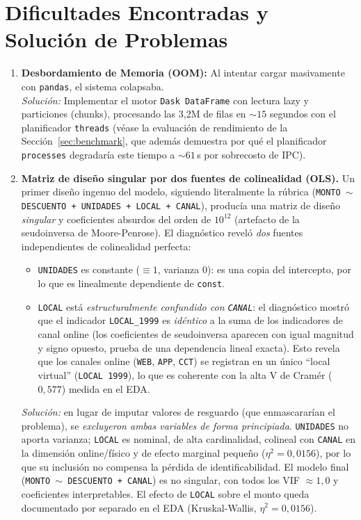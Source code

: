 \documentclass[12pt,letterpaper]{article}
\begin{document}
\section{Dificultades Encontradas y Solución de Problemas}
\label{sec:dificultades}
\begin{enumerate}
    \item \textbf{Desbordamiento de Memoria (OOM):} Al intentar cargar masivamente con \texttt{pandas}, el sistema colapsaba. \\ 
    \textit{Solución:} Implementar el motor \texttt{Dask DataFrame} con lectura lazy y particiones (chunks), procesando las 3,2M de filas en $\sim 15$ segundos con el planificador \texttt{threads} (véase la evaluación de rendimiento de la Sección~\ref{sec:benchmark}, que además demuestra por qué el planificador \texttt{processes} degradaría este tiempo a $\sim 61$\,s por sobrecosto de IPC).
    \item \textbf{Matriz de diseño singular por dos fuentes de colinealidad (OLS).} Un primer diseño ingenuo del modelo, siguiendo literalmente la rúbrica (\texttt{MONTO $\sim$ DESCUENTO + UNIDADES + LOCAL + CANAL}), producía una matriz de diseño \textit{singular} y coeficientes absurdos del orden de $10^{12}$ (artefacto de la seudoinversa de Moore-Penrose). El diagnóstico reveló \textit{dos} fuentes independientes de colinealidad perfecta:
    \begin{itemize}
        \item \texttt{UNIDADES} es constante ($\equiv 1$, varianza 0): es una copia del intercepto, por lo que es linealmente dependiente de \texttt{const}.
        \item \texttt{LOCAL} está \textit{estructuralmente confundido con \texttt{CANAL}}: el diagnóstico mostró que el indicador \texttt{LOCAL\_1999} es \textit{idéntico} a la suma de los indicadores de canal online (los coeficientes de seudoinversa aparecen con igual magnitud y signo opuesto, prueba de una dependencia lineal exacta). Esto revela que los canales online (\texttt{WEB}, \texttt{APP}, \texttt{CCT}) se registran en un único ``local virtual'' (\texttt{LOCAL 1999}), lo que es coherente con la alta V de Cramér ($0{,}577$) medida en el EDA.
    \end{itemize}
    \textit{Solución:} en lugar de imputar valores de resguardo (que enmascararían el problema), se \textit{excluyeron ambas variables de forma principiada}. \texttt{UNIDADES} no aporta varianza; \texttt{LOCAL} es nominal, de alta cardinalidad, colineal con \texttt{CANAL} en la dimensión online/físico y de efecto marginal pequeño ($\eta^2=0{,}0156$), por lo que su inclusión no compensa la pérdida de identificabilidad. El modelo final (\texttt{MONTO $\sim$ DESCUENTO + CANAL}) es no singular, con todos los VIF $\approx 1{,}0$ y coeficientes interpretables. El efecto de \texttt{LOCAL} sobre el monto queda documentado por separado en el EDA (Kruskal-Wallis, $\eta^2=0{,}0156$).
\end{enumerate}
\end{document}
